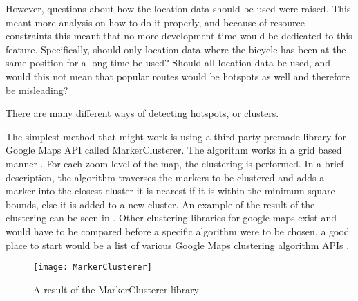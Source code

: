However, questions about how the location data should be used were raised.
This meant more analysis on how to do it properly, and because of resource constraints this meant that no more development time would be dedicated to this feature. 
Specifically, should only location data where the bicycle has been at the same position for a long time be used? 
Should all location data be used, and would this not mean that popular routes would be hotspots as well and therefore be misleading? 

There are many different ways of detecting hotspots, or clusters. %




The simplest method that might work is using a third party premade library for Google Maps API called MarkerClusterer.
The algorithm works in a grid based manner \citep{misc:markerclusterapis}.
For each zoom level of the map, the clustering is performed.
In a brief description, the algorithm traverses the markers to be clustered and adds a marker into the closest cluster it is nearest if it is within the minimum square bounds, else it is added to a new cluster. 
An example of the result of the clustering can be seen in .
Other clustering libraries for google maps exist and would have to be compared before a specific algorithm were to be chosen, a good place to start would be a list of various Google Maps clustering algorithm APIs \citep{misc:markerclusterapis}.

\begin{figure}[h]
\begin{center}
\texttt{[image: MarkerClusterer]}
\caption{A result of the MarkerClusterer library}
\label{fig:markerclusterer}
\end{center}
\end{figure}

